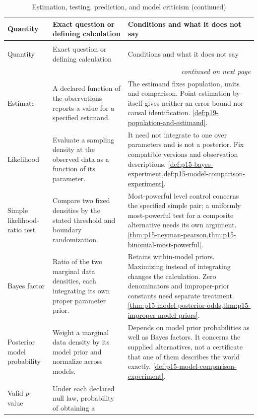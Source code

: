 \begin{longtable}{@{}p{}p{}p{}@{}}
\caption{Estimation, testing, prediction, and model criticism}\\
\toprule
Quantity & Exact question or defining calculation & Conditions and what it does not say \\
\midrule
\endfirsthead
\caption[]{Estimation, testing, prediction, and model criticism (continued)}\\
\toprule
Quantity & Exact question or defining calculation & Conditions and what it does not say \\
\midrule
\endhead
\midrule\multicolumn{3}{r}{\emph{continued on next page}}\\
\endfoot
\endlastfoot
Estimate & A declared function of the observations reports a value for a
specified estimand. & The estimand fixes population, units and comparison.
Point estimation by itself gives neither an error bound nor causal
identification. \cref{def:p19-population-and-estimand}. \\
Likelihood & Evaluate a sampling density at the observed data as a function
of its parameter. & It need not integrate to one over parameters and is not
a posterior. Fix compatible versions and observation descriptions.
\cref{def:p15-bayes-experiment,def:p15-model-comparison-experiment}. \\
Simple likelihood-ratio test & Compare two fixed densities by the stated
threshold and boundary randomization. & Most-powerful level control concerns
the specified simple pair; a uniformly most-powerful test for a composite
alternative needs its own argument.
\cref{thm:p15-neyman-pearson,thm:p15-binomial-most-powerful}. \\
Bayes factor & Ratio of the two marginal data densities, each integrating
its own proper parameter prior. & Retains within-model priors. Maximizing
instead of integrating changes the calculation. Zero denominators and
improper-prior constants need separate treatment.
\cref{thm:p15-model-posterior-odds,thm:p15-improper-model-priors}. \\
Posterior model probability & Weight a marginal data density by its model
prior and normalize across models. & Depends on model prior probabilities
as well as Bayes factors. It concerns the supplied alternatives, not a
certificate that one of them describes the world exactly.
\cref{def:p15-model-comparison-experiment}. \\
Valid \(p\)-value & Under each declared null law, probability of obtaining a

\end{longtable}
